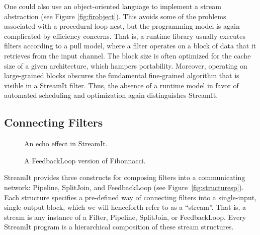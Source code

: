 One could also use an object-oriented language to implement a stream
abstraction (see Figure \ref{fig:firobject}).  This avoids some of the
problems associated with a procedural loop nest, but the programming
model is again complicated by efficiency concerns.  That is, a runtime
library usually executes filters according to a pull model, where a
filter operates on a block of data that it retrieves from the input
channel.  The block size is often optimized for the cache size of a
given architecture, which hampers portability.  Moreover, operating on
large-grained blocks obscures the fundamental fine-grained algorithm
that is visible in a StreamIt filter.  Thus, the absence of a runtime
model in favor of automated scheduling and optimization again
distinguishes StreamIt.

\subsection{Connecting Filters}
\label{sec:connecting}

\begin{figure}[t]
\begin{minipage}{2.175in}
\vspace{-18pt}
\caption{\protect\small An echo effect in StreamIt.
\protect\label{fig:echo}}
\end{minipage}
\hspace{0.2in}
\begin{minipage}{2.4in}
\vspace{-18pt}
\caption{\protect\small A FeedbackLoop version of Fibonnacci.
\protect\label{fig:feed}}
\end{minipage}
\vspace{-12pt}
\end{figure}

StreamIt provides three constructs for composing filters into a
communicating network: Pipeline, SplitJoin, and FeedbackLoop (see
Figure~\ref{fig:structuresp}).  Each structure specifies a pre-defined
way of connecting filters into a single-input, single-output block,
which we will henceforth refer to as a ``stream''.  That is, a stream
is any instance of a Filter, Pipeline, SplitJoin, or FeedbackLoop.
Every StreamIt program is a hierarchical composition of these stream
structures.

